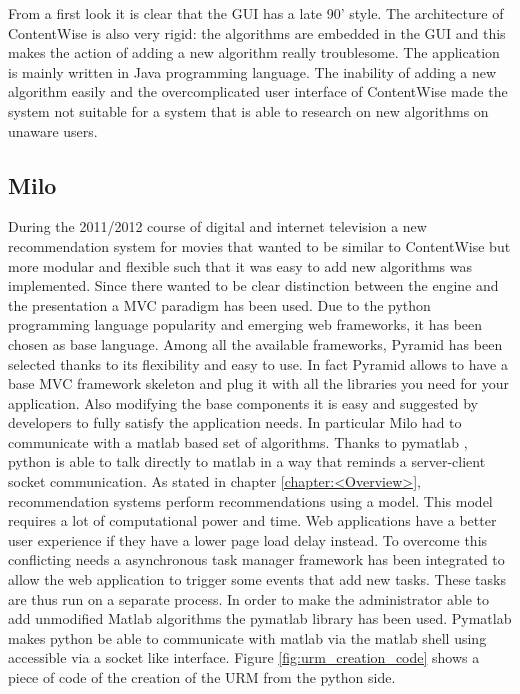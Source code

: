 From a first look it is clear that the \ac{GUI} has a late 90' style. The architecture of ContentWise is also very rigid: the algorithms are embedded in the \ac{GUI} and this makes the action of adding a new algorithm really troublesome.
The application is mainly written in Java programming language.
The inability of adding a new algorithm easily and the overcomplicated user interface of ContentWise made the system not suitable for a system that is able to research on new algorithms on unaware users.

\subsection{Milo}
\label{sec:milo}

During the 2011/2012 course of digital and internet television a new recommendation system for movies that wanted to be similar to ContentWise but more modular and flexible such that it was easy to add new algorithms was implemented.
Since there wanted to be clear distinction between the engine and the presentation a \ac{MVC} \cite{mvc} paradigm has been used. Due to the python programming language popularity and emerging web frameworks, it has been chosen as base language. Among all the available frameworks, Pyramid \cite{pyramid} has been selected thanks to its flexibility and easy to use.
In fact Pyramid allows to have a base \ac{MVC} framework skeleton and plug it with all the libraries you need for your application. Also modifying the base components it is easy and suggested by developers to fully satisfy the application needs. In particular Milo had to communicate with a matlab \cite{matlab} based set of algorithms. Thanks to pymatlab \cite{pymatlab}, python is able to talk directly to matlab in a way that reminds a server-client socket communication.
As stated in chapter \ref{chapter:<Overview>}, recommendation systems perform recommendations using a model. This model requires a lot of computational power and time. Web applications have a better user experience if they have a lower page load delay instead. To overcome this conflicting needs a asynchronous task manager framework has been integrated to allow the web application to trigger some events that add new tasks. These tasks are thus run on a separate process.
In order to make the administrator able to add unmodified Matlab \cite{matlab} algorithms the pymatlab \cite{pymatlab} library has been used. Pymatlab makes python be able to communicate with matlab via the matlab shell using accessible via a socket like interface. Figure \ref{fig:urm_creation_code} shows a piece of code of the creation of the \ac{URM} from the python side.

